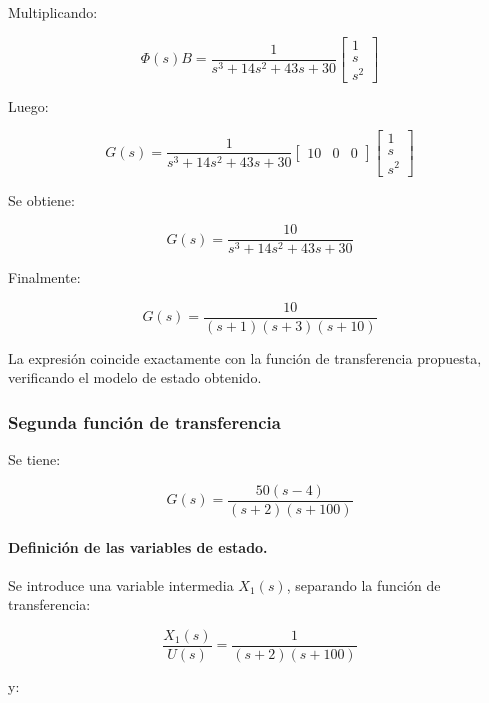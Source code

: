 \documentclass[12pt,a4paper]{article}
\begin{document}
Multiplicando:

\begin{equation}\Phi(s)B=\frac{1}{s^3+14s^2+43s+30} \begin{bmatrix}1\\s\\s^2\end{bmatrix}\end{equation}

Luego:

\begin{equation}G(s)=\frac{1}{s^3+14s^2+43s+30} \begin{bmatrix}10&0&0\end{bmatrix} \begin{bmatrix}1\\s\\s^2\end{bmatrix}\end{equation}

Se obtiene:

\begin{equation}G(s)=\frac{10}{s^3+14s^2+43s+30}\end{equation}

Finalmente:

\begin{equation}\boxed{G(s)=\frac{10}{(s+1)(s+3)(s+10)}}\end{equation}

La expresión coincide exactamente con la función de transferencia propuesta, verificando el modelo de estado obtenido.
\subsubsection*{Segunda función de transferencia}
Se tiene:

\begin{equation}G(s)=\frac{50(s-4)}{(s+2)(s+100)}\end{equation}
\paragraph{Definición de las variables de estado.} Se introduce una variable intermedia $X_1(s)$, separando la función de transferencia:

\begin{equation}\frac{X_1(s)}{U(s)}=\frac{1}{(s+2)(s+100)}\end{equation}

y:
\end{document}

